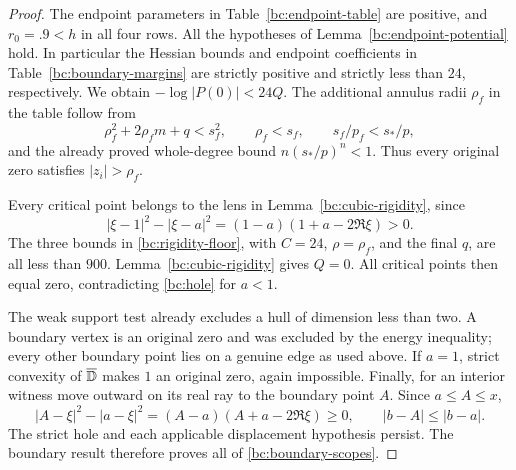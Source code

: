 \begin{proof}
The endpoint parameters in Table~\ref{bc:endpoint-table} are positive,
and $r_0=.9<h$ in all four rows.
All the hypotheses of Lemma~\ref{bc:endpoint-potential} hold.
In particular the Hessian bounds and endpoint coefficients in
Table~\ref{bc:boundary-margins} are strictly positive and strictly
less than $24$, respectively.  We obtain
$-\log|P(0)|<24Q$.
The additional annulus radii $\rho_f$ in the table follow from
\[
 \rho_f^2+2\rho_fm+q<s_f^2,\qquad
 \rho_f<s_f,\qquad
 s_f/p_f<s_*/p,
\]
and the already proved whole-degree bound $n(s_*/p)^n<1$.
Thus every original zero satisfies $|z_i|>\rho_f$.

Every critical point belongs to the lens in
Lemma~\ref{bc:cubic-rigidity}, since
\[
 |\xi-1|^2-|\xi-a|^2=(1-a)(1+a-2\Re\xi)>0.
\]
The three bounds in \eqref{bc:rigidity-floor}, with $C=24$,
$\rho=\rho_f$, and the final $q$, are all less than $900$.
Lemma~\ref{bc:cubic-rigidity} gives $Q=0$.  All critical points
then equal zero, contradicting \eqref{bc:hole} for $a<1$.

The weak support test already excludes a hull of dimension less than
two.  A boundary vertex is an original zero and was excluded by
the energy inequality; every other boundary point lies on a genuine
edge as used above.  If $a=1$, strict convexity of $\overline{\mathbb D}$
makes $1$ an original zero, again impossible.
Finally, for an interior witness move outward on its real ray to the
boundary point $A$.  Since $a\leq A\leq x$,
\[
 |A-\xi|^2-|a-\xi|^2=(A-a)(A+a-2\Re\xi)\geq0,\qquad
 |b-A|\leq|b-a|.
\]
The strict hole and each applicable displacement hypothesis persist.
The boundary result therefore proves all of \eqref{bc:boundary-scopes}.
\end{proof}

